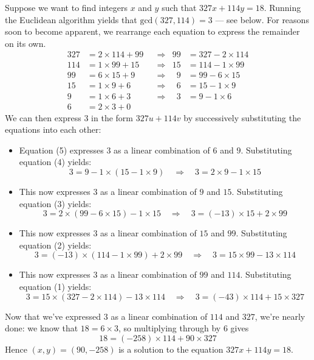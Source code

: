 \begin{example}
Suppose we want to find integers $x$ and $y$ such that $327x+114y=18$. Running the Euclidean algorithm yields that $\mathrm{gcd}(327,114)=3$ --- see below. For reasons soon to become apparent, we rearrange each equation to express the remainder on its own.
\begin{align*}
327 &= 2 \times 114 + 99 && \Rightarrow & 99 &= 327 - 2 \times 114 \tag{1} \\
114 &= 1 \times 99 + 15 && \Rightarrow & 15 &= 114 - 1 \times 99 \tag{2} \\
99 &= 6 \times 15 + 9 && \Rightarrow & \hspace{6pt}9 &= 99 - 6 \times 15 \tag{3} \\
15 &= 1 \times 9 + 6 && \Rightarrow & \hspace{6pt}6 &= 15 - 1 \times 9 \tag{4} \\
9 &= 1 \times 6 + 3 && \Rightarrow & \hspace{6pt}3 &= 9 - 1 \times 6 \tag{5} \\
6 &= 2 \times 3 + 0 && 
\end{align*}
We can then express $3$ in the form $327u+114v$ by successively substituting the equations into each other:
\begin{itemize}
\item Equation (5) expresses $3$ as a linear combination of $6$ and $9$. Substituting equation (4) yields:
\[ 3 = 9 - 1 \times (15 - 1 \times 9) \quad \Rightarrow \quad 3 = 2 \times 9 - 1 \times 15 \]
\item This now expresses $3$ as a linear combination of $9$ and $15$. Substituting equation (3) yields:
\[ 3 = 2 \times (99 - 6 \times 15) - 1 \times 15 \quad \Rightarrow \quad 3 = (-13)\times 15 + 2 \times 99 \]
\item This now expresses $3$ as a linear combination of $15$ and $99$. Substituting equation (2) yields:
\[ 3 = (-13)\times(114 - 1 \times 99) + 2 \times 99 \quad \Rightarrow \quad 3 = 15 \times 99 - 13 \times 114 \]
\item This now expresses $3$ as a linear combination of $99$ and $114$. Substituting equation (1) yields:
\[ 3 = 15 \times (327 - 2 \times 114) - 13 \times 114 \quad \Rightarrow \quad 3 = (-43) \times 114 + 15 \times 327 \]
\end{itemize}
Now that we've expressed $3$ as a linear combination of $114$ and $327$, we're nearly done: we know that $18 = 6 \times 3$, so multiplying through by $6$ gives
\[ 18 = (-258) \times 114 + 90 \times 327 \]
Hence $(x,y) = (90,{-258})$ is a solution to the equation $327x+114y=18$.
\end{example}

